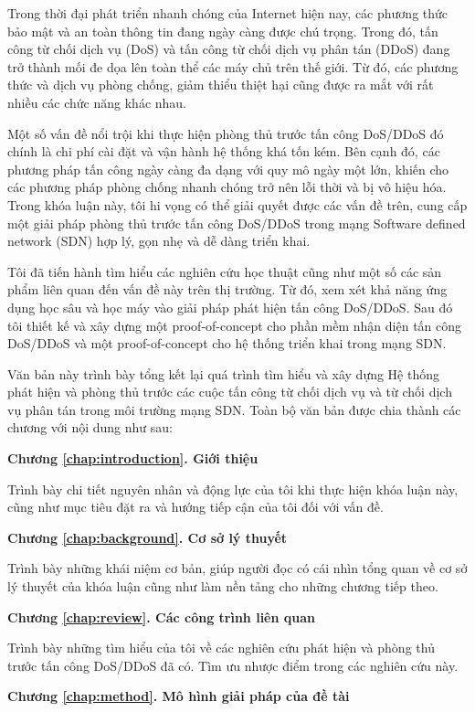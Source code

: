 Trong thời đại phát triển nhanh chóng của Internet hiện nay, các phương thức bảo mật và an toàn thông tin đang ngày càng được chú trọng. Trong đó, tấn công từ chối dịch vụ (DoS) và tấn công từ chối dịch vụ phân tán (DDoS) đang trở thành mối đe dọa lên toàn thể các máy chủ trên thế giới. Từ đó, các phương thức và dịch vụ phòng chống, giảm thiểu thiệt hại cũng được ra mắt với rất nhiều các chức năng khác nhau.

Một số vấn đề nổi trội khi thực hiện phòng thủ trước tấn công DoS/DDoS đó chính là chi phí cài đặt và vận hành hệ thống khá tốn kém. Bên cạnh đó, các phương pháp tấn công ngày càng đa dạng với quy mô ngày một lớn, khiến cho các phương pháp phòng chống nhanh chóng trở nên lỗi thời và bị vô hiệu hóa. Trong khóa  luận này, tôi hi vọng có thể giải quyết được các vấn đề trên, cung cấp một giải pháp phòng thủ trước tấn công DoS/DDoS trong mạng Software defined network (SDN) hợp lý, gọn nhẹ và dễ dàng triển khai.

Tôi đã tiến hành tìm hiểu các nghiên cứu học thuật cũng như một số các sản phẩm liên quan đến vấn đề này trên thị trường. Từ đó, xem xét khả năng ứng dụng học sâu và học máy vào giải pháp phát hiện tấn công DoS/DDoS. Sau đó tôi thiết kế và xây dựng một proof-of-concept cho phần mềm nhận diện tấn công DoS/DDoS và một proof-of-concept cho hệ thống triển khai trong mạng SDN.

Văn bản này trình bày tổng kết lại quá trình tìm hiểu và xây dựng Hệ thống phát hiện và phòng thủ trước các cuộc tấn công từ chối dịch vụ và từ chối dịch vụ phân tán trong môi trường mạng SDN. Toàn bộ văn bản được chia thành các chương với nội dung như sau:

\textbf{Chương \ref{chap:introduction}. Giới thiệu}

Trình bày chi tiết nguyên nhân và động lực của tôi khi thực hiện khóa luận này, cũng như mục tiêu đặt ra và hướng tiếp cận của tôi đối với vấn đề.

\textbf{Chương \ref{chap:background}. Cơ sở lý thuyết}

Trình bày những khái niệm cơ bản, giúp người đọc có cái nhìn tổng quan về cơ sở lý thuyết của khóa luận cũng như làm nền tảng cho những chương tiếp theo.

\textbf{Chương \ref{chap:review}. Các công trình liên quan}

Trình bày những tìm hiểu của tôi về các nghiên cứu phát hiện và phòng thủ trước tấn công DoS/DDoS đã có. Tìm ưu nhược điểm trong các nghiên cứu này.

\textbf{Chương \ref{chap:method}. Mô hình giải pháp của đề tài}

